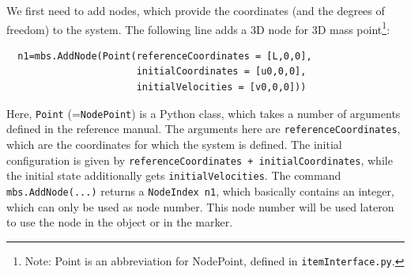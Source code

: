 %
We first need to add nodes, which provide the coordinates (and the degrees of freedom) to the system.
The following line adds a 3D node for 3D mass point\footnote{Note: Point is an abbreviation for NodePoint, defined in \texttt{itemInterface.py}.}:
\pythonstyle\begin{lstlisting}
  n1=mbs.AddNode(Point(referenceCoordinates = [L,0,0], 
                       initialCoordinates = [u0,0,0], 
                       initialVelocities = [v0,0,0]))
\end{lstlisting}
Here, \texttt{Point} (=\texttt{NodePoint}) is a Python class, which takes a number of arguments defined in the reference manual. The arguments here are \texttt{referenceCoordinates}, which are the coordinates for which the system is defined. The initial configuration is given by \texttt{referenceCoordinates + initialCoordinates}, while the initial state additionally gets \texttt{initialVelocities}.
The command \texttt{mbs.AddNode(...)} returns a \texttt{NodeIndex n1}, which basically contains an integer, which can only be used as node number. This node number will be used lateron to use the node in the object or in the marker.

